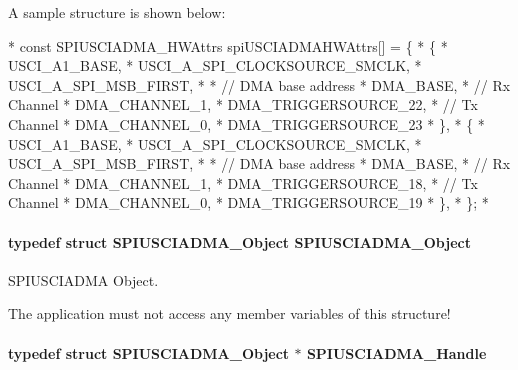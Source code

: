 A sample structure is shown below\-: 
\begin{DoxyCode}
*  \textcolor{keyword}{const} SPIUSCIADMA_HWAttrs spiUSCIADMAHWAttrs[] = \{
*      \{
*          USCI\_A1\_BASE,
*          USCI\_A\_SPI\_CLOCKSOURCE\_SMCLK,
*          USCI\_A\_SPI\_MSB\_FIRST,
*
*          \textcolor{comment}{// DMA base address}
*          DMA\_BASE,
*          \textcolor{comment}{// Rx Channel}
*          DMA\_CHANNEL\_1,
*          DMA\_TRIGGERSOURCE\_22,
*          \textcolor{comment}{// Tx Channel}
*          DMA\_CHANNEL\_0,
*          DMA\_TRIGGERSOURCE\_23
*      \},
*      \{
*          USCI\_A1\_BASE,
*          USCI\_A\_SPI\_CLOCKSOURCE\_SMCLK,
*          USCI\_A\_SPI\_MSB\_FIRST,
*
*          \textcolor{comment}{// DMA base address}
*          DMA\_BASE,
*          \textcolor{comment}{// Rx Channel}
*          DMA\_CHANNEL\_1,
*          DMA\_TRIGGERSOURCE\_18,
*          \textcolor{comment}{// Tx Channel}
*          DMA\_CHANNEL\_0,
*          DMA\_TRIGGERSOURCE\_19
*      \},
*  \};
*  
\end{DoxyCode}
\paragraph[{S\-P\-I\-U\-S\-C\-I\-A\-D\-M\-A\-\_\-\-Object}]{\setlength{\rightskip}{0pt plus 5cm}typedef struct {\bf S\-P\-I\-U\-S\-C\-I\-A\-D\-M\-A\-\_\-\-Object}  {\bf S\-P\-I\-U\-S\-C\-I\-A\-D\-M\-A\-\_\-\-Object}}\label{_s_p_i_u_s_c_i_a_d_m_a_8h_add524b2585b8b4aaaede70d3f0356c9d}


S\-P\-I\-U\-S\-C\-I\-A\-D\-M\-A Object. 

The application must not access any member variables of this structure! 
\paragraph[{S\-P\-I\-U\-S\-C\-I\-A\-D\-M\-A\-\_\-\-Handle}]{\setlength{\rightskip}{0pt plus 5cm}typedef struct {\bf S\-P\-I\-U\-S\-C\-I\-A\-D\-M\-A\-\_\-\-Object} $\ast$ {\bf S\-P\-I\-U\-S\-C\-I\-A\-D\-M\-A\-\_\-\-Handle}}\label{_s_p_i_u_s_c_i_a_d_m_a_8h_a4bf7edb9d6368c9d51b97e4733c1dcb3}



